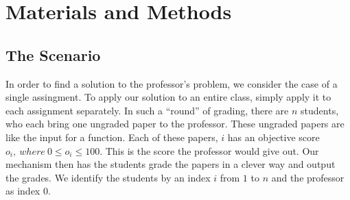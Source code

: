 \documentclass[12pt, Arial]{article}
\begin{document}
\section{Materials and Methods}
\subsection{The Scenario}
In order to find a solution to the professor’s problem, we consider the case of a single assingment. To apply our solution to an entire class, simply apply it to each assignment separately. In such a ``round'' of grading, there are $n$ students, who each bring one ungraded paper to the professor. These ungraded papers are like the input for a function. Each of these papers, $i$ has an objective score $o_i,~where~ 0\leq o_i \leq 100$. This is the score the professor would give out. Our mechanism then has the students grade the papers in a clever way and output the grades. We identify the students by an index $i$ from $1$ to $n$ and the professor as index $0$.
\end{document}
